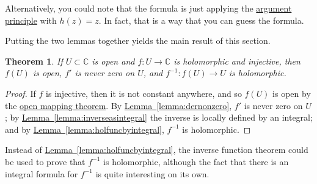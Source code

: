 \documentclass[12pt,openany]{book}
\newcommand{\C}{{\mathbb{C}}}
\theoremstyle{plain}
\newtheorem{thm}{Theorem}[section]
\theoremstyle{remark}
\theoremstyle{definition}
\theoremstyle{exercise}
\theoremstyle{example}
\newcommand{\lemmaref}[1]{\hyperref[#1]{Lemma~\ref*{#1}}}
\begin{document}
Alternatively, you could note that the formula is just applying the
\hyperref[thm:argprinc]{argument principle} with $h(z)=z$.
In fact, that is a way that you can guess the formula.

Putting the two lemmas together yields the main result of this section.

\begin{thm}
If $U \subset \C$ is open and $f \colon U \to \C$ is holomorphic and
injective, then $f(U)$ is open, $f'$ is never zero on $U$, and $f^{-1}
\colon f(U) \to U$ is holomorphic.
\end{thm}

\begin{proof}
If $f$ is injective, then it is not constant anywhere, and so $f(U)$ is open by
the \hyperref[thm:OMT]{open mapping theorem}.
By \lemmaref{lemma:dernonzero}, $f'$ is never zero
on $U$; by \lemmaref{lemma:inverseasintegral} the inverse is locally defined
by an integral; and by
\lemmaref{lemma:holfuncbyintegral},
$f^{-1}$ is holomorphic.
\end{proof}

Instead of \lemmaref{lemma:holfuncbyintegral},
the inverse function theorem could be used to prove that $f^{-1}$ is
holomorphic, although the
fact that there is an integral formula for $f^{-1}$ is quite interesting on
its own.
\end{document}
